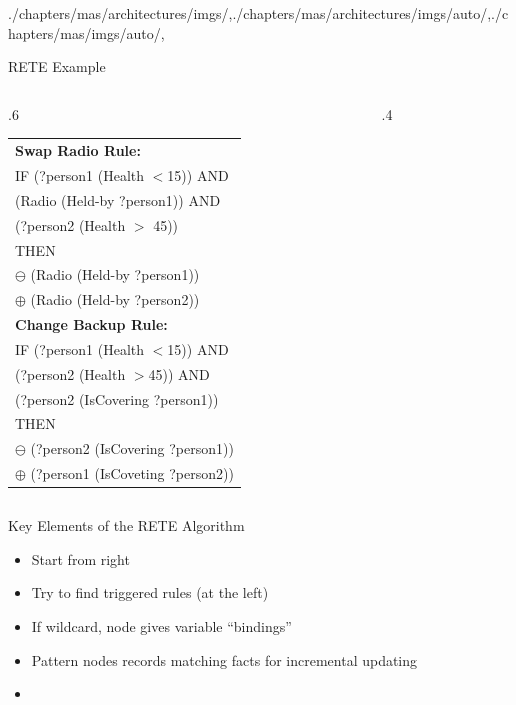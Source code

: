 \begin{graphicspathcontext}{{./chapters/mas/architectures/imgs/},{./chapters/mas/architectures/imgs/auto/},{./chapters/mas/imgs/auto/},\old}
\begin{frame}{RETE Example}
	\begin{columns}
		\begin{column}{.6\linewidth}
			\smaller\smaller
			\begin{tabularx}{\linewidth}{|X|}
			\hline
			\textbf{Swap Radio Rule:} \\
			\ttfamily
			IF (?person1 (Health $<$15)) AND \\
			(Radio (Held-by ?person1)) AND \\
			(?person2 (Health $>$ 45)) \\
			THEN \\
			$\ominus$ (Radio (Held-by ?person1)) \\
			$\oplus$ (Radio (Held-by ?person2)) \\
			
			\hline
			\textbf{Change Backup Rule:} \\
			\ttfamily
			IF	(?person1 (Health $<$15)) AND \\
			(?person2 (Health $>$45)) AND \\
			(?person2 (IsCovering ?person1)) \\
			THEN \\
			$\ominus$ (?person2 (IsCovering
			?person1)) \\
			$\oplus$ (?person1 (IsCoveting
			?person2)) \\
			\hline
			\end{tabularx}
		\end{column}
		\begin{column}{.4\linewidth}
		\end{column}
	\end{columns}
\end{frame}

\begin{frame}{{Key Elements} of the RETE Algorithm}
	\begin{itemize}
		\item Start from right
		\vspace{.5cm}
		\item Try to find triggered rules (at the left)
		\vspace{.5cm}
		\item If wildcard, node gives variable ``bindings''
		\vspace{.5cm}
		\item Pattern nodes records matching facts for incremental updating
		\vspace{.5cm}
		\item {}
	\end{itemize}
\end{frame}


\end{graphicspathcontext}
